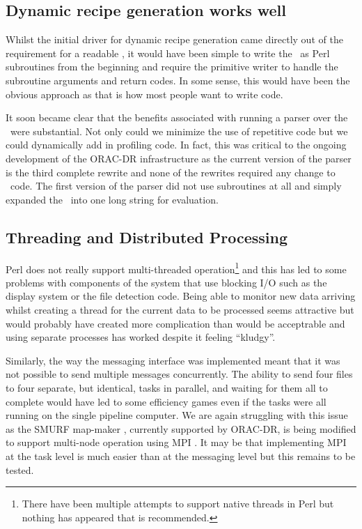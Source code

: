 \documentclass[final,authoryear,5p,times,twocolumn]{elsarticle}
\begin{document}
\subsection{Dynamic recipe generation works well}

Whilst the initial driver for dynamic recipe generation came directly
out of the requirement for a readable \recipe, it would have been
simple to write the \primitives\ as Perl subroutines from the
beginning and require the primitive writer to handle the subroutine
arguments and return codes. In some sense, this would have been the
obvious approach as that is how most people want to write code.

It soon became clear that the benefits associated
with running a parser over the \primitives\ were substantial. Not only
could we minimize the use of repetitive code but we could dynamically
add in profiling code. In fact, this was critical to the ongoing
development of the ORAC-DR infrastructure as the current version of
the parser is the third complete rewrite and none of the rewrites
required any change to \primitive\ code. The first version of the
parser did not use subroutines at all and simply expanded the \recipe\
into one long string for evaluation.

\subsection{Threading and Distributed Processing}

Perl does not really support multi-threaded
operation\footnote{There have been multiple attempts to support native
  threads in Perl but nothing has appeared that is recommended.}
and this has led to some problems with components of the system that
use blocking I/O such as the display system or the file detection
code. Being able to monitor new data arriving whilst creating a thread for the
current data to be processed seems attractive but would probably have
created more complication than would be acceptrable and using separate
processes has worked despite it feeling ``kludgy''.

Similarly, the way the messaging interface was implemented meant that
it was not possible to send multiple messages concurrently. The
ability to send four files to four separate, but identical, tasks in
parallel, and waiting for them all to complete would have led to some
efficiency games even if the tasks were all running on the single
pipeline computer. We are again struggling with this issue as
the SMURF map-maker \citep[][]{2013MNRAS.430.2545C}, currently supported by
ORAC-DR, is being modified to support
multi-node operation using MPI \citep{2014ASPC..485..399M}. It may be
that implementing MPI at the task level is much easier than at the
messaging level but this remains to be tested.
\end{document}
